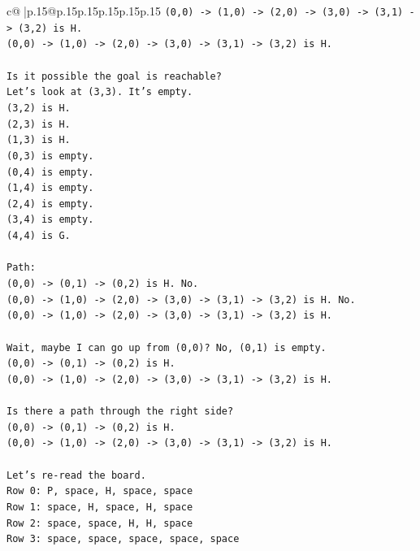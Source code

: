 \documentclass{article}
\begin{document}
{\begin{supertabular}{c@{$\;$}|p{.15\linewidth}@{}p{.15\linewidth}p{.15\linewidth}p{.15\linewidth}p{.15\linewidth}p{.15\linewidth}}
{{{\texttt{(0,0) {-}> (1,0) {-}> (2,0) {-}> (3,0) {-}> (3,1) {-}> (3,2) is H.} \\
\texttt{(0,0) {-}> (1,0) {-}> (2,0) {-}> (3,0) {-}> (3,1) {-}> (3,2) is H.} \\
\\ 
\texttt{Is it possible the goal is reachable?} \\
\texttt{Let's look at (3,3). It's empty.} \\
\texttt{(3,2) is H.} \\
\texttt{(2,3) is H.} \\
\texttt{(1,3) is H.} \\
\texttt{(0,3) is empty.} \\
\texttt{(0,4) is empty.} \\
\texttt{(1,4) is empty.} \\
\texttt{(2,4) is empty.} \\
\texttt{(3,4) is empty.} \\
\texttt{(4,4) is G.} \\
\\ 
\texttt{Path:} \\
\texttt{(0,0) {-}> (0,1) {-}> (0,2) is H. No.} \\
\texttt{(0,0) {-}> (1,0) {-}> (2,0) {-}> (3,0) {-}> (3,1) {-}> (3,2) is H. No.} \\
\texttt{(0,0) {-}> (1,0) {-}> (2,0) {-}> (3,0) {-}> (3,1) {-}> (3,2) is H.} \\
\\ 
\texttt{Wait, maybe I can go up from (0,0)? No, (0,1) is empty.} \\
\texttt{(0,0) {-}> (0,1) {-}> (0,2) is H.} \\
\texttt{(0,0) {-}> (1,0) {-}> (2,0) {-}> (3,0) {-}> (3,1) {-}> (3,2) is H.} \\
\\ 
\texttt{Is there a path through the right side?} \\
\texttt{(0,0) {-}> (0,1) {-}> (0,2) is H.} \\
\texttt{(0,0) {-}> (1,0) {-}> (2,0) {-}> (3,0) {-}> (3,1) {-}> (3,2) is H.} \\
\\ 
\texttt{Let's re{-}read the board.} \\
\texttt{Row 0: P, space, H, space, space} \\
\texttt{Row 1: space, H, space, H, space} \\
\texttt{Row 2: space, space, H, H, space} \\
\texttt{Row 3: space, space, space, space, space} \\
}}}
\end{supertabular}}
\end{document}
